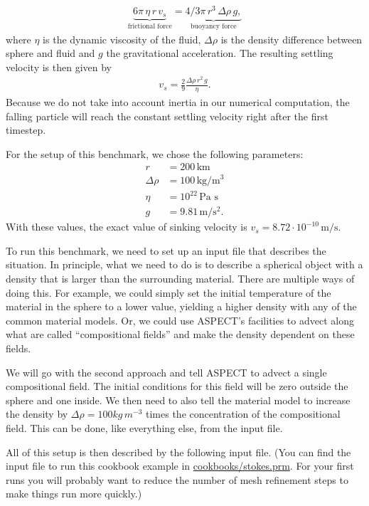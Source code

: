 \documentclass{article}
\newcommand{\aspect}{\textsc{ASPECT}}
\begin{document}
\begin{align}
  \label{eq:stokes-law}
  \underbrace{6 \pi \, \eta \, r \, v_s}_{\text{frictional force}} =
  \underbrace{4/3 \pi \, r^3 \, \Delta\rho \, g,}_{\text{buoyancy force}}
\end{align}
where $\eta$ is the dynamic viscosity of the fluid, $\Delta\rho$ is the
density difference between sphere and fluid and $g$ the gravitational
acceleration. The resulting settling velocity is then given by
\begin{align}
  \label{eq:stokes-velo}
  v_s = \frac{2}{9} \frac{\Delta\rho \, r^2 \, g}{\eta}.
\end{align}
Because we do not take into account inertia in our numerical computation,
the falling particle will reach the constant settling velocity right after
the first timestep.

For the setup of this benchmark, we chose the following parameters:
\begin{align*}
  \label{eq:stokes-parameters}
  r &= 200 \, \text{km}\\
  \Delta\rho &= 100 \, \text{kg}/\text{m}^3\\
  \eta &= 10^{22} \, \text{Pa s}\\
  g &= 9.81 \, \text{m}/\text{s}^2.
\end{align*}
With these values, the exact value of sinking velocity is $v_s =
8.72 \cdot 10^{-10} \, \text{m}/\text{s}$.

To run this benchmark, we need to set up an input file that describes the
situation. In principle, what we need to do is to describe a spherical object
with a density that is larger than the surrounding material. There are multiple
ways of doing this. For example, we could simply set the initial temperature of
the material in the sphere to a lower value, yielding a higher density with any
of the common material models. Or, we could use \aspect{}'s facilities to advect
along what are called ``compositional fields'' and make the density dependent on
these fields.

We will go with the second approach and tell \aspect{} to advect a single
compositional field. The initial conditions for this field will be zero outside
the sphere and one inside. We then need to also tell the material model to
increase the density by $\Delta\rho=100 kg\, m^{-3}$ times the concentration of
the compositional field. This can be done, like everything else, from the input
file.

All of this setup is then described by the following input file.
(You can find the input file to run this cookbook example in
\url{cookbooks/stokes.prm}. For your first runs you will probably want to
reduce the number of mesh refinement steps to make things run more quickly.)
\end{document}
